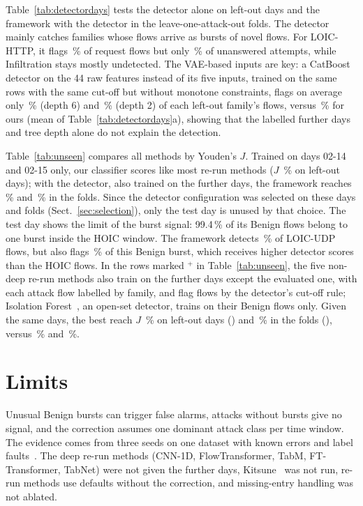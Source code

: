 \documentclass[runningheads,a4paper]{llncs}
\begin{document}
Table~\ref{tab:detectordays} tests the detector alone on left-out days and the framework with the detector in the leave-one-attack-out folds. The detector mainly catches families whose flows arrive as bursts of novel flows. For LOIC-HTTP, it flags \LoicRequestDetection\,\% of request flows but only \LoicNoReplyDetection\,\% of unanswered attempts, while Infiltration stays mostly undetected. The VAE-based inputs are key: a CatBoost detector on the 44 raw features instead of its five inputs, trained on the same rows with the same cut-off but without monotone constraints, flags on average only \RawDetectorDetection\,\% (depth 6) and \RawDetectorTwoDetection\,\% (depth 2) of each left-out family's flows, versus \DetectorAloneDetection\,\% for ours (mean of Table~\ref{tab:detectordays}a), showing that the labelled further days and tree depth alone do not explain the detection.

Table~\ref{tab:unseen} compares all methods by Youden's $J$. Trained on days 02-14 and 02-15 only, our classifier scores like most re-run methods ($J$ \JClassifierDays\,\% on left-out days); with the detector, also trained on the further days, the framework reaches \JOursDays\,\% and \JOursFolds\,\% in the folds. Since the detector configuration was selected on these days and folds (Sect.~\ref{sec:selection}), only the test day is unused by that choice. The test day shows the limit of the burst signal: 99.4\,\% of its Benign flows belong to one burst inside the HOIC window. The framework detects \TestUdpMean\,\% of LOIC-UDP flows, but also flags \TestBurstFprMean\,\% of this Benign burst, which receives higher detector scores than the HOIC flows. In the rows marked $^+$ in Table~\ref{tab:unseen}, the five non-deep re-run methods also train on the further days except the evaluated one, with each attack flow labelled by family, and flag flows by the detector's cut-off rule; Isolation Forest~\cite{liu2008}, an open-set detector, trains on their Benign flows only. Given the same days, the best reach $J$ \JEqualBestDays\,\% on left-out days (\JEqualBestDaysName) and \JEqualBestFolds\,\% in the folds (\JEqualBestFoldsName), versus \JOursDaysEqual\,\% and \JOursFoldsEqual\,\%.

\section{Limits}\label{sec:discussion}
Unusual Benign bursts can trigger false alarms, attacks without bursts give no signal, and the correction assumes one dominant attack class per time window.
The evidence comes from three seeds on one dataset with known errors and label faults~\cite{engelen2021,liu2022error}. The deep re-run methods (CNN-1D, FlowTransformer, TabM, FT-Transformer, TabNet) were not given the further days, Kitsune~\cite{mirsky2018} was not run, re-run methods use defaults without the correction, and missing-entry handling was not ablated.
\end{document}
